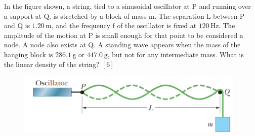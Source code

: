 
\begin{problem}
    In the figure shown, a string, tied to a sinusoidal oscillator at P and running over a support at Q, is stretched by a block of mass m. The separation L between P and Q is $\qty{1.20}{\m}$, and the frequency f of the oscillator is fixed at $\qty{120}{\Hz}$. The amplitude of the motion at P is small enough for that point to be considered a node. A node also exists at Q. A standing wave appears when the mass of the hanging block is $\qty{286.1}{\g}$ or $\qty{447.0}{\g}$, but not for any intermediate mass. What is the linear density of the string? \hfill $[6]$
    \begin{figure}[H]
        \centering
        \includegraphics[width=0.8\linewidth]{spho_book_TYS_images/2021SPhO_5.png}
    \end{figure}
\end{problem}

